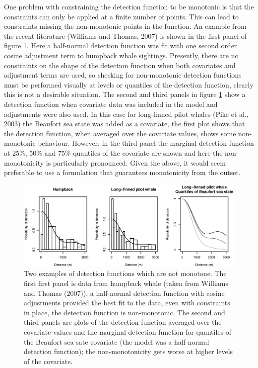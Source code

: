 \documentclass[useAMS,referee, usegraphicx]{biom}
\begin{document}
One problem with constraining the detection function to be monotonic is that the constraints can only be applied at a finite number of points. This can lead to constraints missing the non-monotonic points in the function. An example from the recent literature (Williams and Thomas, 2007) is shown in the first panel of figure \ref{fig1}. Here a half-normal detection function was fit with one second order cosine adjustment term to humpback whale sightings. Presently, there are no constraints on the shape of the detection function when both covariates and adjustment terms are used, so checking for non-monotonic detection functions must be performed visually at levels or quantiles of the detection function, clearly this is not a desirable situation. The second and third panels in figure \ref{fig1} show a detection function when covariate data was included in the model and adjustments were also used. In this case for long-finned pilot whales (Pike et al., 2003) the Beaufort sea state was added as a covariate, the first plot shows that the detection function, when averaged over the covariate values, shows some non-monotonic behaviour. However, in the third panel the marginal detection function at 25\%, 50\% and 75\% quantiles of the covariate are shown and here the non-monotonicity is particularly pronounced. Given the above, it would seem preferable to use a formulation that guarantees monotonicity from the outset.

\begin{figure}
\centering
\includegraphics[width=\textwidth]{figs/figure1.eps}
\caption{Two examples of detection functions which are not monotone. The first first panel is data from humpback whale (taken from Williams and Thomas (2007)), a half-normal detection function with cosine adjustments provided the best fit to the data, even with constraints in place, the detection function is non-monotonic. The second and third panels are plots of the detection function averaged over the covariate values and the marginal detection function for quantiles of the Beaufort sea sate covariate (the model was a half-normal detection function); the non-monotonicity gets worse at higher levels of the covariate.}
\label{fig1}
\end{figure}
\end{document}
